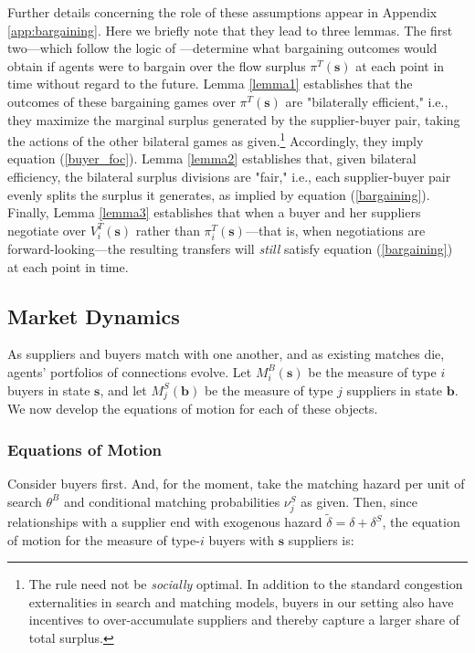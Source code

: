 \documentclass[12pt]{article} \usepackage{amsmath,amssymb,amsthm,geometry,graphicx,setspace,algorithm,algpseudocode,float}
\begin{document}
\par
Further details concerning the role of these assumptions appear in Appendix \ref{app:bargaining}. Here we briefly note that they lead to three lemmas. The first two---which follow the logic of \citet{deFontenayGans}---determine what bargaining outcomes would obtain if agents were to bargain over the flow surplus $\pi^T(\mathbf{s})$ at each point in time without regard to the future. Lemma \ref{lemma1} establishes that the outcomes of these bargaining games over $\pi^T(\mathbf{s})$ are "bilaterally efficient," i.e., they maximize the marginal surplus generated by the supplier-buyer pair, taking the actions of the other bilateral games as given.\footnote{The rule need not be \textit{socially} optimal. In addition to the standard congestion externalities in search and matching models, buyers in our setting also have incentives to over-accumulate suppliers and thereby capture a larger share of total surplus.\medskip} Accordingly, they imply equation (\ref{buyer_foc}). Lemma \ref{lemma2} establishes that, given bilateral efficiency, the bilateral surplus divisions are "fair," i.e., each supplier-buyer pair evenly splits the surplus it generates, as implied by equation (\ref{bargaining}). Finally, Lemma \ref{lemma3} establishes that when a buyer and her suppliers negotiate over $V_i^T(\mathbf{s})$ rather than $\pi_i^T(\mathbf{s})$---that is, when negotiations are forward-looking---the resulting transfers will \textit{still} satisfy equation (\ref{bargaining}) at each point in time.  



\subsection{Market Dynamics}

As suppliers and buyers match with one another, and as existing matches die, agents' portfolios of connections evolve. Let $M_i^B(\mathbf{s})$ be the measure of type $i$ buyers in state $\textbf{s}$, and let $M_j^S(\mathbf{b})$ be the measure of type $j$ suppliers in state $\textbf{b}$. We now develop the equations of motion for each of these objects. 

\subsubsection{Equations of Motion}
\label{sec:eqn_of_motion}
Consider buyers first. And, for the moment, take the matching hazard per unit of search $\theta^B$ and conditional matching probabilities $\nu^S_j$ as given. Then, since relationships with a supplier end with exogenous hazard $\tilde{\delta} = \delta + \delta^S$, the equation of motion for the measure of type-$i$ buyers with $\mathbf{s}$ suppliers is:
\end{document}
